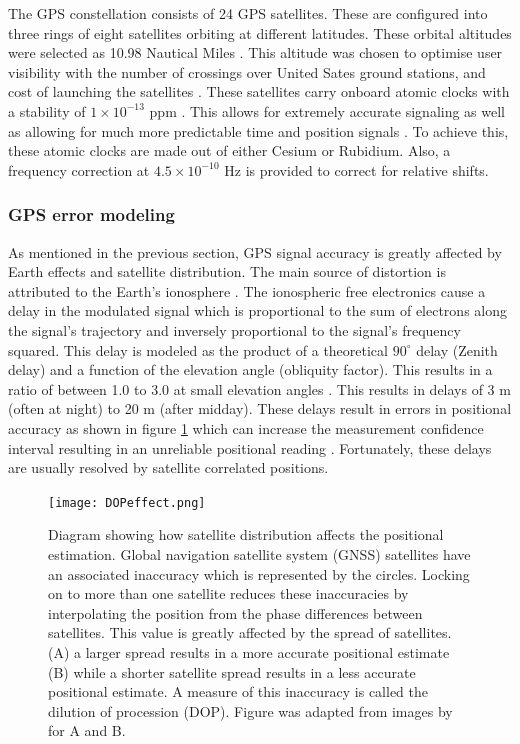 The GPS constellation consists of 24 GPS satellites. These are configured into three rings of eight satellites orbiting at different latitudes. These orbital altitudes were selected as 10.98 Nautical Miles \cite{spilker1996global}. This altitude was chosen to optimise user visibility with the number of crossings over United Sates ground stations, and cost of launching the satellites \cite{spilker1996global}. These satellites carry onboard atomic clocks with a stability of $1\times10^{-13}$ ppm . This allows for extremely accurate signaling as well as allowing for much more predictable time and position signals \cite{spilker1996global}. To achieve this, these atomic clocks are made out of either Cesium or Rubidium. Also, a frequency correction at $4.5\times10^{-10}$ Hz is provided to correct for relative shifts. \par

\subsubsection{GPS error modeling}

As mentioned in the previous section, GPS signal accuracy is greatly affected by Earth effects and satellite distribution. The main source of distortion is attributed to the Earth's ionosphere \cite{spilker1996global}. The ionospheric free electronics cause a delay in the modulated signal which is proportional to the sum of electrons along the signal's trajectory and inversely proportional to the signal's frequency squared. This delay is modeled as the product of a theoretical $90^\circ$ delay (Zenith delay) and a function of the elevation angle (obliquity factor). This results in a ratio of between 1.0 to 3.0 at small elevation angles \cite{spilker1996global}. This results in delays of 3 m (often at night) to 20 m (after midday). These delays result in errors in positional accuracy as shown in figure \ref{fig:DOP_effects} which can increase the measurement confidence interval resulting in an unreliable positional reading \cite{spilker1996global}. Fortunately, these delays are usually resolved by satellite correlated positions.

\begin{figure}[H]
	\centering
	\texttt{[image: DOPeffect.png]}
	\caption{Diagram showing how satellite distribution affects the positional estimation.  Global navigation satellite system (GNSS) satellites have an associated inaccuracy which is represented by the circles. Locking on to more than one satellite reduces these inaccuracies by interpolating the position from the phase differences between satellites. This value is greatly affected by the spread of satellites. (A) a larger spread results in a more accurate positional estimate (B) while a shorter satellite spread results in a less accurate positional estimate. A measure of this inaccuracy is called the dilution of procession (DOP). Figure was adapted from images by \cite{GISGeo2020DOP} for A and B.}
	\label{fig:DOP_effects}
\end{figure}

